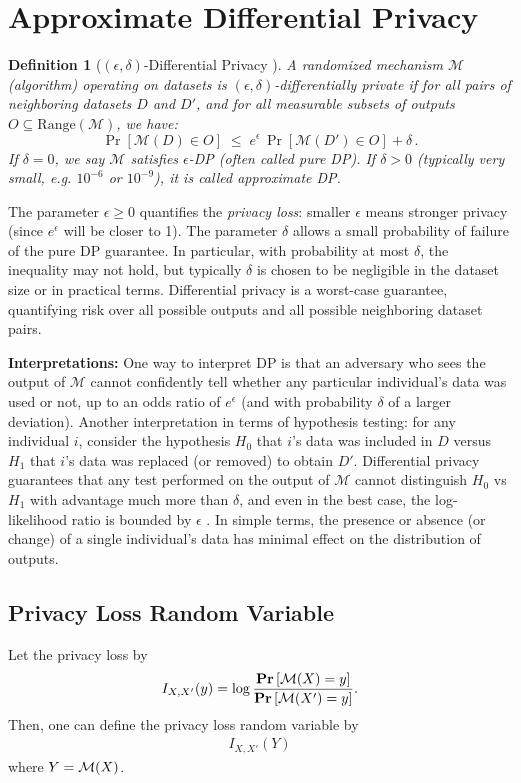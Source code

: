 \documentclass[11pt, a4paper]{article}
\newtheorem{definition}{Definition}
\begin{document}
\section{Approximate Differential Privacy}
\begin{definition}[$(\epsilon,\delta)$-Differential Privacy \cite{Dwork2006}] \label{def:app-dp}
A randomized mechanism $\mathcal{M}$ (algorithm) operating on datasets is $(\epsilon,\delta)$-differentially private if for all pairs of neighboring datasets $D$ and $D'$, and for all measurable subsets of outputs $O \subseteq \text{Range}(\mathcal{M})$, we have:
\[ 
\Pr[\mathcal{M}(D) \in O] \;\le\; e^{\epsilon} \,\Pr[\mathcal{M}(D') \in O] + \delta\,.
\] 
If $\delta=0$, we say $\mathcal{M}$ satisfies $\epsilon$-DP (often called \emph{pure} DP). If $\delta > 0$ (typically very small, e.g. $10^{-6}$ or $10^{-9}$), it is called \emph{approximate} DP.
\end{definition}

The parameter $\epsilon \ge 0$ quantifies the \textit{privacy loss}: smaller $\epsilon$ means stronger privacy (since $e^{\epsilon}$ will be closer to 1). The parameter $\delta$ allows a small probability of failure of the pure DP guarantee. In particular, with probability at most $\delta$, the inequality may not hold, but typically $\delta$ is chosen to be negligible in the dataset size or in practical terms. Differential privacy is a worst-case guarantee, quantifying risk over all possible outputs and all possible neighboring dataset pairs. 

\textbf{Interpretations:} One way to interpret DP is that an adversary who sees the output of $\mathcal{M}$ cannot confidently tell whether any particular individual’s data was used or not, up to an odds ratio of $e^{\epsilon}$ (and with probability $\delta$ of a larger deviation). Another interpretation in terms of hypothesis testing: for any individual $i$, consider the hypothesis $H_0$ that $i$'s data was included in $D$ versus $H_1$ that $i$'s data was replaced (or removed) to obtain $D'$. Differential privacy guarantees that any test performed on the output of $\mathcal{M}$ cannot distinguish $H_0$ vs $H_1$ with advantage much more than $\delta$, and even in the best case, the log-likelihood ratio is bounded by $\epsilon$ \cite{Wasserman2010}. In simple terms, the presence or absence (or change) of a single individual's data has minimal effect on the distribution of outputs.

\subsection{Privacy Loss Random Variable}
Let the privacy loss by
\begin{align}
    I_{X, X'} (y) = \log \frac{\Prob{\cM(X)=y}}{\Prob{\cM(X')=y}}.
\end{align}
Then, one can define the privacy loss random variable by
\begin{align}
    I_{X, X'}(Y) 
\end{align}
where $Y={\cal M}(X)$.
\end{document}
